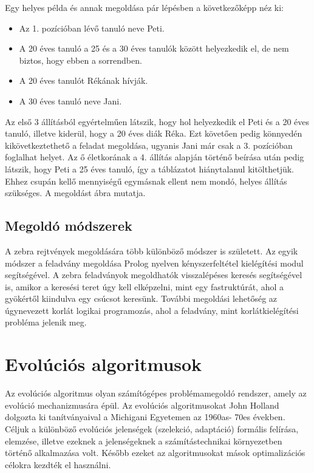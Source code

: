 \documentclass[12ppt,a4paper,oneside]{report}
\begin{document}
Egy helyes példa és annak megoldása pár lépésben a következőképp néz ki:
\begin{itemize}
\item Az 1. pozícióban lévő tanuló neve Peti.
\item A 20 éves tanuló a 25 és a 30 éves tanulók között helyezkedik el, de nem biztos, hogy ebben a sorrendben.
\item A 20 éves tanulót Rékának hívják.
\item A 30 éves tanuló neve Jani.
\end{itemize}

Az első 3 állításból egyértelműen látszik, hogy hol helyezkedik el Peti és a 20 éves tanuló, illetve kiderül, hogy a 20 éves diák Réka. Ezt követően pedig könnyedén kikövetkeztethető a feladat megoldása, ugyanis Jani már csak a 3. pozícióban foglalhat helyet. Az ő életkorának a 4. állítás alapján történő beírása után pedig látszik, hogy Peti a 25 éves tanuló, így a táblázatot hiánytalanul kitölthetjük. Ehhez csupán kellő mennyiségű egymásnak ellent nem mondó, helyes állítás szükséges. A megoldást  ábra mutatja.


    \section{Megoldó módszerek} %

A zebra rejtvények megoldására több különböző módszer is született. 
Az egyik módszer a feladvány megoldása Prolog nyelven kényszerfeltétel kielégítési modul segítségével. 
A zebra feladványok megoldhatók visszalépéses keresés segítségével is, amikor a keresési teret úgy kell elképzelni, mint egy fastruktúrát, ahol a gyökértől kiindulva egy csúcsot keresünk.
További megoldási lehetőség az úgynevezett korlát logikai programozás, ahol a feladvány, mint korlátkielégítési probléma jelenik meg.


\chapter{Evolúciós algoritmusok} %

Az evolúciós algoritmus olyan számítógépes problémamegoldó rendszer, amely az evolúció mechanizmusára épül. Az evolúciós algoritmusokat John Holland dolgozta ki tanítványaival a Michigani Egyetemen az 1960as- 70es években. Céljuk a különböző evolúciós jelenségek (szelekció, adaptáció) formális felírása, elemzése, illetve ezeknek a jelenségeknek a számítástechnikai környezetben történő alkalmazása volt. Később ezeket az algoritmusokat mások optimalizációs célokra kezdték el használni.
\end{document}

